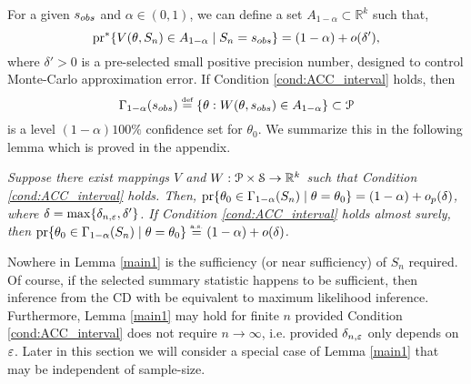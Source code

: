 
For a given $s_{\rm obs}$ and $\alpha \in (0,1)$,  we can define a set $A_{1 - \alpha} \subset \mathbb{R}^k$  such that, 
	\begin{equation}
	\label{eq:A} 
	\text{pr}^*\{V(\theta, S_n) \in A_{1 - \alpha} \mid S_n = s_{\rm obs}\} = (1 - \alpha) + o(\delta'), 
	\end{equation}  
	where $\delta' > 0$ is a pre-selected small positive precision number, designed to control Monte-Carlo approximation error. If Condition \ref{cond:ACC_interval} holds, then 
	\begin{equation}
	\label{eq:AB}
	\Gamma_{1 - \alpha}(s_{\rm obs}) \stackrel{\hbox{\tiny def}} = \{\theta: W(\theta, s_{\rm obs}) \in A_{1 - \alpha} \} \subset {\cal P}
	\end{equation}
is a level $(1 - \alpha) 100\%$ confidence set for $\theta_0$. We summarize this in the following lemma which is proved in the appendix. 
	
\begin{lemma}\label{main1}
{\it Suppose there exist mappings $V$ and $W: \P \times {\cal S} \rightarrow \mathbb{R}^k$ such that Condition \ref{cond:ACC_interval} holds.
Then, $\text{\rm pr}\{\theta_0 \in \Gamma_{1 - \alpha}(S_n) \mid \theta =  \theta_0 \}  = (1 - \alpha) + o_p(\delta)$, where $\delta = \max\{\delta_{n,\veps},\delta'\}$. If Condition \ref{cond:ACC_interval} holds almost surely, then 
$\text{\rm pr}\{\theta_0 \in \Gamma_{1 - \alpha}(S_n) \mid \theta = \theta_0 \}  \stackrel{\hbox{\tiny a.s.}}= (1 - \alpha) + o(\delta)$.}
\end{lemma}
	

Nowhere in Lemma \ref{main1} is the sufficiency (or near sufficiency) of $S_{n}$ required. Of course, if the selected summary statistic happens to be sufficient, then inference from the CD with be equivalent to maximum likelihood inference. Furthermore, Lemma \ref{main1} may hold for finite $n$ provided Condition \ref{cond:ACC_interval} does not require $n \rightarrow \infty$, i.e. provided $\delta_{n,\veps}$ only depends on $\veps$. Later in this section we will consider a special case of Lemma \ref{main1} that may be independent of sample-size. 

